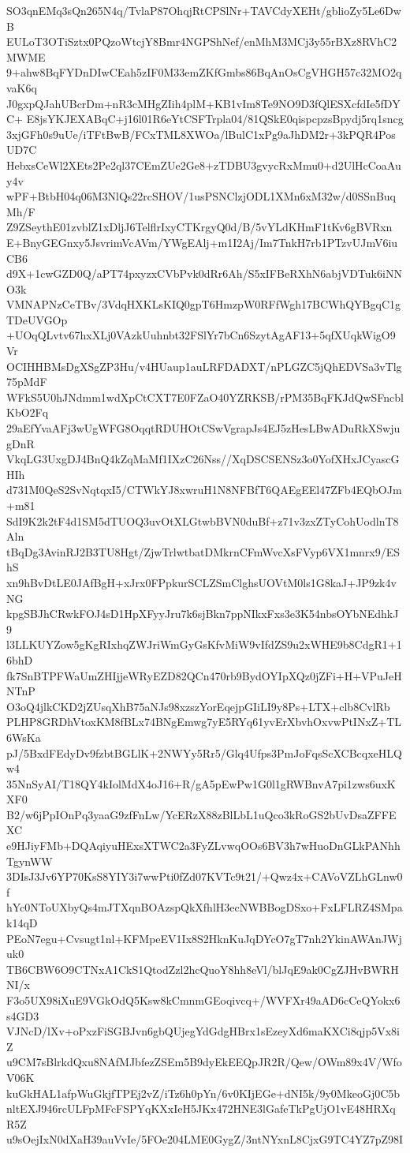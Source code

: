 SO3qnEMq3sQn265N4q/TvlaP87OhqjRtCPSlNr+TAVCdyXEHt/gblioZy5Le6DwB
EULoT3OTiSztx0PQzoWtcjY8Bmr4NGPShNef/enMhM3MCj3y55rBXz8RVhC2MWME
9+ahw8BqFYDnDIwCEah5zIF0M33emZKfGmbs86BqAnOsCgVHGH57c32MO2qvaK6q
J0gxpQJahUBcrDm+nR3cMHgZIih4plM+KB1vIm8Te9NO9D3fQlESXcfdIe5fDYC+
E8jsYKJEXABqC+j16l01R6eYtCSFTrpla04/81QSkE0qispcpzsBpydj5rq1sncg
3xjGFh0s9uUe/iTFtBwB/FCxTML8XWOa/lBulC1xPg9aJhDM2r+3kPQR4PosUD7C
HebxsCeWl2XEts2Pe2ql37CEmZUe2Ge8+zTDBU3gvycRxMmu0+d2UlHcCoaAuy4v
wPF+BtbH04q06M3NlQs22rcSHOV/1usPSNClzjODL1XMn6xM32w/d0SSnBuqMh/F
Z9ZSeythE01zvblZ1xDljJ6TelflrIxyCTKrgyQ0d/B/5vYLdKHmF1tKv6gBVRxn
E+BnyGEGnxy5JsvrimVcAVm/YWgEAlj+m1I2Aj/Im7TnkH7rb1PTzvUJmV6iuCB6
d9X+1cwGZD0Q/aPT74pxyzxCVbPvk0dRr6Ah/S5xIFBeRXhN6abjVDTuk6iNNO3k
VMNAPNzCeTBv/3VdqHXKLsKIQ0gpT6HmzpW0RFfWgh17BCWhQYBgqC1gTDeUVGOp
+UOqQLvtv67hxXLj0VAzkUuhnbt32FSlYr7bCn6SzytAgAF13+5qfXUqkWigO9Vr
OCIHHBMsDgXSgZP3Hu/v4HUaup1auLRFDADXT/nPLGZC5jQhEDVSa3vTlg75pMdF
WFkS5U0hJNdmm1wdXpCtCXT7E0FZaO40YZRKSB/rPM35BqFKJdQwSFncblKbO2Fq
29aEfYvaAFj3wUgWFG8OqqtRDUHOtCSwVgrapJs4EJ5zHesLBwADuRkXSwjugDnR
VkqLG3UxgDJ4BnQ4kZqMaMf1IXzC26Nss//XqDSCSENSz3o0YofXHxJCyascGHIh
d731M0QeS2SvNqtqxI5/CTWkYJ8xwruH1N8NFBfT6QAEgEEl47ZFb4EQbOJm+m81
SdI9K2k2tF4d1SM5dTUOQ3uvOtXLGtwbBVN0duBf+z71v3zxZTyCohUodlnT8Aln
tBqDg3AvinRJ2B3TU8Hgt/ZjwTrlwtbatDMkrnCFmWvcXsFVyp6VX1mnrx9/EShS
xn9hBvDtLE0JAfBgH+xJrx0FPpkurSCLZSmClghsUOVtM0ls1G8kaJ+JP9zk4vNG
kpgSBJhCRwkFOJ4sD1HpXFyyJru7k6sjBkn7ppNIkxFxs3e3K54nbsOYbNEdhkJ9
l3LLKUYZow5gKgRIxhqZWJriWmGyGsKfvMiW9vIfdZS9u2xWHE9b8CdgR1+16bhD
fk7SnBTPFWaUmZHIjjeWRyEZD82QCn470rb9BydOYIpXQz0jZFi+H+VPuJeHNTnP
O3oQ4jlkCKD2jZUsqXhB75aNJs98xzszYorEqejpGIiLI9y8Ps+LTX+clb8CvlRb
PLHP8GRDhVtoxKM8fBLx74BNgEmwg7yE5RYq61yvErXbvhOxvwPtINxZ+TL6WsKa
pJ/5BxdFEdyDv9fzbtBGLlK+2NWYy5Rr5/Glq4Ufps3PmJoFqsScXCBcqxeHLQw4
35NnSyAI/T18QY4kIolMdX4oJ16+R/gA5pEwPw1G0l1gRWBnvA7pi1zws6uxKXF0
B2/w6jPpIOnPq3yaaG9zfFnLw/YcERzX88zBlLbL1uQco3kRoGS2bUvDsaZFFEXC
e9HJiyFMb+DQAqiyuHExsXTWC2a3FyZLvwqOOs6BV3h7wHuoDnGLkPANhhTgynWW
3DIsJ3Jv6YP70KsS8YIY3i7wwPti0fZd07KVTc9t21/+Qwz4x+CAVoVZLhGLnw0f
hYc0NToUXbyQs4mJTXqnBOAzspQkXfhlH3ecNWBBogDSxo+FxLFLRZ4SMpak14qD
PEoN7egu+Cvsugt1nl+KFMpeEV1Ix8S2HknKuJqDYcO7gT7nh2YkinAWAnJWjuk0
TB6CBW6O9CTNxA1CkS1QtodZzl2hcQuoY8hh8eVl/blJqE9ak0CgZJHvBWRHNI/x
F3o5UX98iXuE9VGkOdQ5Ksw8kCmnmGEoqivcq+/WVFXr49aAD6cCeQYokx6s4GD3
VJNcD/lXv+oPxzFiSGBJvn6gbQUjegYdGdgHBrx1sEzeyXd6maKXCi8qjp5Vx8iZ
u9CM7sBlrkdQxu8NAfMJbfezZSEm5B9dyEkEEQpJR2R/Qew/OWm89x4V/WfoV06K
kuGkHAL1afpWuGkjfTPEj2vZ/iTz6h0pYn/6v0KIjEGe+dNI5k/9y0MkeoGj0C5b
nltEXJ946rcULFpMFcFSPYqKXxIeH5JKx472HNE3lGafeTkPgUjO1vE48HRXqR5Z
u9sOejIxN0dXaH39auVvIe/5FOe204LME0GygZ/3ntNYxnL8CjxG9TC4YZ7pZ98I
